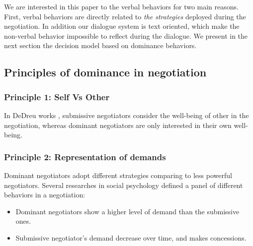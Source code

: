\documentclass{llncs}
\begin{document}
					\par We are interested in this paper to the verbal behaviors for two main reasons. First, verbal behaviors are directly related to \emph{the strategies} deployed during the negotiation. In addition our dialogue system is text oriented, which make the non-verbal behavior impossible to reflect during the dialogue. 
					We present in the next section the decision model based on dominance behaviors. 
					
					\subsection{Principles of dominance in negotiation}
					\subsubsection{Principle 1: Self Vs Other}
						In DeDreu works \cite{de1995impact}, submissive negotiators consider the well-being of other in the negotiation, whereas dominant negotiators are only interested in their own well-being.
					
					\subsubsection{Principle 2: Representation of demands}
					
					Dominant negotiators adopt different strategies comparing to less powerful negotiators. Several researches in social psychology defined a panel of different behaviors in a negotiation:
					
					\begin{itemize}
						\item Dominant negotiators show a higher level of demand than the submissive ones.
						\item  Submissive negotiator's demand decrease over time, and makes concessions.
					
					\end{itemize} 
					
					
					
\end{document}
